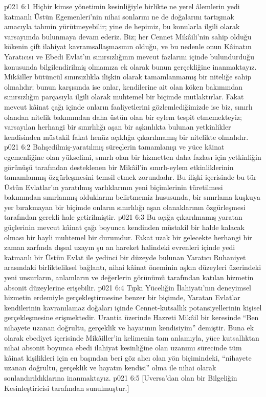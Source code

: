 \vs p021 6:1 Hiçbir kimse yönetimin kesinliğiyle birlikte ne yerel âlemlerin yedi katmanlı Üstün Egemenleri’nin nihai sonlarını ne de doğalarını tartışmak amacıyla tahmin yürütmeyebilir; yine de hepimiz, bu konularla ilgili olarak varsayımda bulunmaya devam ederiz. Biz; her Cennet Mikâili’nin sahip olduğu kökenin çift ilahiyat kavramsallaşmasının  olduğu, ve bu nedenle onun Kâinatın Yaratıcısı ve Ebedi Evlat’ın sınırsızlığının mevcut fazlarını içinde bulundurduğu konusunda bilgilendirilmiş olmamıza ek olarak bunun gerçekliğine inanmaktayız. Mikâiller bütüncül sınırsızlıkla ilişkin olarak tamamlanmamış bir niteliğe sahip olmalıdır; bunun karşısında ise onlar, kendilerine ait olan köken bakımından sınırsızlığın parçasıyla ilgili olarak muhtemel bir biçimde mutlaktırlar. Fakat mevcut kâinat çağı içinde onların faaliyetlerini gözlemlediğimizde ise biz, sınırlı olandan nitelik bakımından daha üstün olan bir eylem tespit etmemekteyiz; varsayılan herhangi bir sınırlılığı aşan bir aşkınlıkta bulunan yetkinlikler kendisinden müstakil fakat henüz açıklığa çıkarılmamış bir nitelikte olmalıdır.
\vs p021 6:2 Bahşedilmiş\hyp{}yaratılmış süreçlerin tamamlanışı ve yüce kâinat egemenliğine olan yükselimi, sınırlı olan bir hizmetten daha fazlası için yetkinliğin görünüşü tarafından desteklenen bir Mikâil’in sınırlı\hyp{}eylem etkinliklerinin tamamlanmış özgürleşmesini temsil etmek zorundadır. Bu ilişki içerisinde bu tür Üstün Evlatlar’ın yaratılmış varlıklarının yeni biçimlerinin türetilmesi bakımından sınırlanmış olduklarını belirtmemiz hususunda, bir sınırlama kuşkuya yer bırakmayan bir biçimde onların sınırlılığı aşan olanaklarının özgürleşmesi tarafından gerekli hale getirilmiştir.
\vs p021 6:3 Bu açığa çıkarılmamış yaratan güçlerinin mevcut kâinat çağı boyunca kendinden müstakil bir halde kalacak olması bir hayli muhtemel bir durumdur. Fakat uzak bir gelecekte herhangi bir zaman zarfında dışsal uzayın şu an hareket halindeki evrenleri içinde yedi katmanlı bir Üstün Evlat ile yedinci bir düzeyde bulunan Yaratıcı Ruhaniyet arasındaki birlikteliksel bağlantı, nihai kâinat öneminin aşkın düzeyleri üzerindeki yeni unsurların, anlamların ve değerlerin görünümü tarafından katılan hizmetin absonit düzeylerine erişebilir.
\vs p021 6:4 Tıpkı Yüceliğin İlahiyatı’nın deneyimsel hizmetin erdemiyle gerçekleştirmesine benzer bir biçimde, Yaratan Evlatlar kendilerinin kavranılamaz doğaları içinde Cennet\hyp{}kutsallık potansiyellerinin kişisel gerçekleşmesine erişmektedir. Urantia üzerinde Hazreti Mikâil bir keresinde “Ben nihayete uzanan doğrultu, gerçeklik ve hayatının kendisiyim” demiştir. Buna ek olarak ebediyet içerisinde Mikâiller'in kelimenin tam anlamıyla, yüce kutsallıktan nihai absonit boyunca ebedi ilahiyat kesinliğine olan uzanımı sürecinde tüm kâinat kişilikleri için en başından beri göz alıcı olan yön biçimindeki, “nihayete uzanan doğrultu, gerçeklik ve hayatın kendisi” olma ile nihai olarak sonlandırıldıklarına inanmaktayız.
\vs p021 6:5 [Uversa’dan olan bir Bilgeliğin Kesinleştiricisi tarafından sunulmuştur.]
